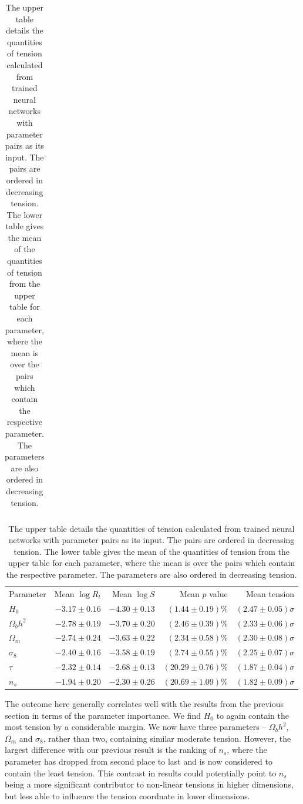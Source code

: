 \documentclass[%
 reprint,
 amsmath,amssymb,
 aps,
]{revtex4-2}
\begin{document}
\begin{table}
\begin{ruledtabular}
\begin{tabular}{l r r r r}
\end{tabular}
\rule{0pt}{5pt}
\begin{tabular}{l r r r r}
    Parameter & Mean $\log R_t$ & Mean $\log S$ & Mean $p$ value & Mean tension \\
    \colrule
    $H_0$           & $-3.17 \pm 0.16$ & $-4.30 \pm 0.13$ & $(1.44 \pm 0.19)\%$ & $(2.47 \pm 0.05)\sigma$ \\
    $\Omega_b h^2$  & $-2.78 \pm 0.19$ & $-3.70 \pm 0.20$ & $(2.46 \pm 0.39)\%$ & $(2.33 \pm 0.06)\sigma$ \\
    $\Omega_m$      & $-2.74 \pm 0.24$ & $-3.63 \pm 0.22$ & $(2.34 \pm 0.58)\%$ & $(2.30 \pm 0.08)\sigma$ \\
    $\sigma_8$      & $-2.40 \pm 0.16$ & $-3.58 \pm 0.19$ & $(2.74 \pm 0.55)\%$ & $(2.25 \pm 0.07)\sigma$ \\
    $\tau$          & $-2.32 \pm 0.14$ & $-2.68 \pm 0.13$ & $(20.29 \pm 0.76)\%$ & $(1.87 \pm 0.04)\sigma$ \\
    $n_s$           & $-1.94 \pm 0.20$ & $-2.30 \pm 0.26$ & $(20.69 \pm 1.09)\%$ & $(1.82 \pm 0.09)\sigma$ \\

\end{tabular}
\end{ruledtabular}
    
\caption{The upper table details the quantities of tension calculated from trained neural networks with parameter pairs as its input. The pairs are ordered in decreasing tension. The lower table gives the mean of the quantities of tension from the upper table for each parameter, where the mean is over the pairs which contain the respective parameter. The parameters are also ordered in decreasing tension.}
\label{table:pairwise}
\end{table}

The outcome here generally correlates well with the results from the previous section in terms of the parameter importance. We find $H_0$ to again contain the most tension by a considerable margin. We now have three parameters -- $\Omega_b h^2$, $\Omega_m$ and $\sigma_8$, rather than two, containing similar moderate tension. However, the largest difference with our previous result is the ranking of $n_s$, where the parameter has dropped from second place to last and is now considered to contain the least tension. This contrast in results could potentially point to $n_s$ being a more significant contributor to non-linear tensions in higher dimensions, but less able to influence the tension coordnate in lower dimensions.
\end{document}
